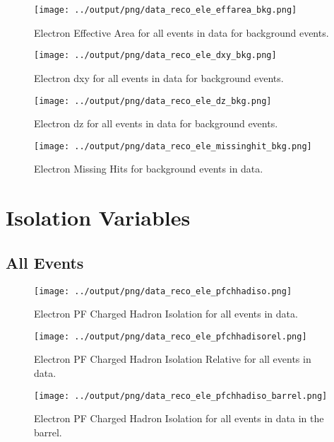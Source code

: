 \documentclass[11pt]{book}
\begin{document}
\begin{figure}[htb]
\centering
\texttt{[image: ../output/png/data\_reco\_ele\_effarea\_bkg.png]}
\caption{Electron Effective Area for all events in data for background events.}
\label{fig:data_ele_effarea_bkg}
\end{figure}

\begin{figure}[htb]
\centering
\texttt{[image: ../output/png/data\_reco\_ele\_dxy\_bkg.png]}
\caption{Electron dxy for all events in data for background events.}
\label{fig:data_ele_dxy_bkg}
\end{figure}

\begin{figure}[htb]
\centering
\texttt{[image: ../output/png/data\_reco\_ele\_dz\_bkg.png]}
\caption{Electron dz for all events in data for background events.}
\label{fig:data_ele_dz_bkg}
\end{figure}

\begin{figure}[htb]
\centering
\texttt{[image: ../output/png/data\_reco\_ele\_missinghit\_bkg.png]}
\caption{Electron Missing Hits for background events in data.}
\label{fig:data_ele_missinghĩt_bkg}
\end{figure}
\clearpage

\chapter{Isolation Variables}
\section{All Events}

\begin{figure}[htb]
\centering
\texttt{[image: ../output/png/data\_reco\_ele\_pfchhadiso.png]}
\caption{Electron PF Charged Hadron Isolation for all events in data.}
\label{fig:data_ele_pfchhadiso}
\end{figure}

\begin{figure}[htb]
\centering
\texttt{[image: ../output/png/data\_reco\_ele\_pfchhadisorel.png]}
\caption{Electron PF Charged Hadron Isolation Relative for all events in data.}
\label{fig:data_ele_pfchhadisorel}
\end{figure}

\begin{figure}[htb]
\centering
\texttt{[image: ../output/png/data\_reco\_ele\_pfchhadiso\_barrel.png]}
\caption{Electron PF Charged Hadron Isolation for all events in data in the barrel.}
\label{fig:data_ele_pfchhadiso_barrel}
\end{figure}
\end{document}
